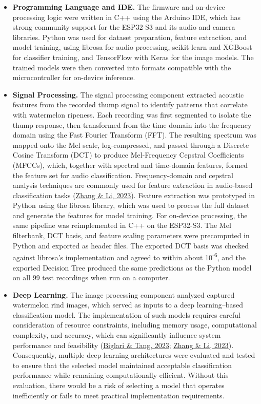 \begin{thesisprose}
\begin{itemize}
\item \textbf{Programming Language and IDE.} The firmware and on-device processing logic were written in C++ using the Arduino IDE, which has strong community support for the ESP32-S3 and its audio and camera libraries. Python was used for dataset preparation, feature extraction, and model training, using librosa for audio processing, scikit-learn and XGBoost for classifier training, and TensorFlow with Keras for the image models. The trained models were then converted into formats compatible with the microcontroller for on-device inference.

\item \textbf{Signal Processing.} The signal processing component extracted acoustic features from the recorded thump signal to identify patterns that correlate with watermelon ripeness. Each recording was first segmented to isolate the thump response, then transformed from the time domain into the frequency domain using the Fast Fourier Transform (FFT). The resulting spectrum was mapped onto the Mel scale, log-compressed, and passed through a Discrete Cosine Transform (DCT) to produce Mel-Frequency Cepstral Coefficients (MFCCs), which, together with spectral and time-domain features, formed the feature set for audio classification. Frequency-domain and cepstral analysis techniques are commonly used for feature extraction in audio-based classification tasks (\hyperlink{cite.zhang2023}{Zhang \& Li, 2023}). Feature extraction was prototyped in Python using the librosa library, which was used to process the full dataset and generate the features for model training. For on-device processing, the same pipeline was reimplemented in C++ on the ESP32-S3. The Mel filterbank, DCT basis, and feature scaling parameters were precomputed in Python and exported as header files. The exported DCT basis was checked against librosa’s implementation and agreed to within about 10\textsuperscript{-}\textsuperscript{6}, and the exported Decision Tree produced the same predictions as the Python model on all 99 test recordings when run on a computer.

\item \textbf{Deep Learning.} The image processing component analyzed captured watermelon rind images, which served as inputs to a deep learning–based classification model. The implementation of such models requires careful consideration of resource constraints, including memory usage, computational complexity, and accuracy, which can significantly influence system performance and feasibility (\hyperlink{cite.biglari2023}{Biglari \& Tang, 2023}; \hyperlink{cite.zhang2023}{Zhang \& Li, 2023}). Consequently, multiple deep learning architectures were evaluated and tested to ensure that the selected model maintained acceptable classification performance while remaining computationally efficient. Without this evaluation, there would be a risk of selecting a model that operates inefficiently or fails to meet practical implementation requirements.


\end{itemize}
\end{thesisprose}
